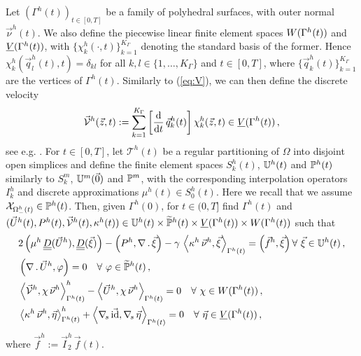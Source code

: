 Let $(\Gamma^h(t))_{t\in[0,T]}$ be a family of polyhedral surfaces, with
outer normal $\vec\nu^h(t)$. We also define the piecewise linear finite element
spaces $\Wht$ and $\Vht$, with $\{\chi^h_k(\cdot,t)\}_{k=1}^{K_\Gamma}$
denoting the standard basis of the former. Hence $\chi^h_k(\vec q^h_l(t),t) =
\delta_{kl}$ for all $k,l \in \{1,\ldots,K_\Gamma\}$ and $t \in [0,T]$, where
$\{\vec q^h_k(t)\}_{k=1}^{K_\Gamma}$ are the vertices of $\Gamma^h(t)$.
Similarly to (\ref{eq:V}), we can then define the discrete velocity
\begin{equation*}
\V^h(\vec z, t):=
\sum_{k=1}^{K_\Gamma}\left[\ddt\,\vec q^h_k(t)\right] \chi^h_k(\vec z, t)
\in \Vht\,,
\end{equation*}
see e.g. \cite[(3.3)]{tpfs}. For $t\in [0,T]$, let $\mathcal{T}^h(t)$ be a
regular partitioning of $\Omega$ into disjoint open simplices and define the
finite element spaces $S^h_k(t)$, $\uspacesimple^h(t)$ and $\pspace^h(t)$
similarly to $S^m_k$, $\uspacedisc{0}{m}$ and $\pspace^m$, with the
corresponding interpolation operators $I^h_k$ and discrete approximations
$\mu^h(t) \in S^h_0(t)$. Here we recall that we assume
$\charfcn{\Omega^h_-(t)}\in\pspace^h(t)$. Then, given $\Gamma^h(0)$, for $t\in
(0,T]$ find $\Gamma^h(t)$ and $(\vec U^h(t), P^h(t), \V^h(t), \kappa^h(t)) \in
\uspacesimple^h(t) \times \pnormspace^h(t) \times \Vht \times \Wht$ such that
\begin{subequations}
\begin{align}
& 2\left(\mu^h\,\mat D(\vec U^h), \mat D(\vec \xi) \right)
- \left(P^h, \nabla\,.\,\vec \xi\right) - \gamma\,\left\langle
\kappa^h\,\vec\nu^h, \vec\xi\right\rangle_{\Gamma^h(t)} = \left(\vec f^h, \vec
\xi\right) \forall\ \vec\xi \in \uspacesimple^h(t) \,, \label{eq:sda}\\
& \left(\nabla\,.\,\vec U^h, \varphi\right)  = 0
\quad \forall\ \varphi \in \pnormspace^h(t)\,, \label{eq:sdb} \\
& \left\langle \V^h , \chi\,\vec\nu^h
\right\rangle_{\Gamma^h(t)}^h - \left\langle \vec U^h, \chi\,\vec\nu^h
\right\rangle_{\Gamma^h(t)} = 0 \quad \forall\ \chi \in \Wht\,, \label{eq:sdc}
\\
& \left\langle \kappa^h\,\vec\nu^h, \vec\eta \right\rangle_{\Gamma^h(t)}^h
+ \left\langle \nabs\,\vec\id, \nabs\,\vec \eta \right\rangle_{\Gamma^h(t)} = 0
\quad \forall\ \vec\eta \in \Vht\,, \label{eq:sdd}
\end{align}
\end{subequations}
where $\vec f^h := \vec I^h_2\,\vec f(t)$.

